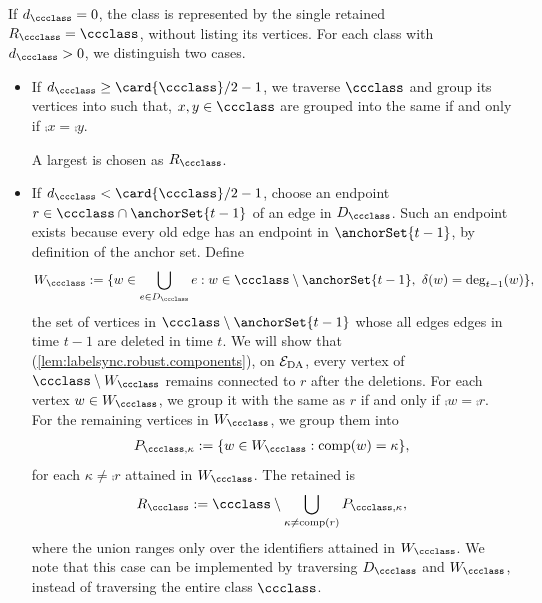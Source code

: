 If $ d_{\ccclass}=0 $, the class is represented by the single retained \piece{} $ R_{\ccclass}=\ccclass $, without listing its vertices.
For each class with $ d_{\ccclass}>0 $, we distinguish two cases.
\begin{itemize}
    \item If $ d_{\ccclass}\ge\card{\ccclass}/2-1 $, we traverse $ \ccclass $ and group its vertices into  such that, $ x,y \in \ccclass $ are grouped into the same \piece{} if and only if $ \comp{x}=\comp{y} $.

    A largest \piece{}  is chosen as $ \retainedPieces{\ccclass} $.
    \item If $ d_{\ccclass}<\card{\ccclass}/2-1 $, choose an endpoint $ r\in\ccclass\cap\anchorSet{t-1} $ of an edge in $ D_{\ccclass} $.
    Such an endpoint exists because every old edge has an endpoint in $ \anchorSet{t-1} $, by definition of the anchor set.
    Define
    \begin{align}
        W_{\ccclass}:=\{w\in\bigcup_{e\in D_{\ccclass}}e:
        w \in \ccclass\setminus\anchorSet{t-1},\ \delIncEdge{w}=\deg_{t-1}(w)\}, \nonumber
    \end{align}
    the set of vertices in $ \ccclass\setminus \anchorSet{t-1} $ whose all edges edges in time $ t-1 $ are deleted in time $ t $.
    We will show that (\cref{lem:labelsync.robust.components}), on $ \mathcal{E}_{\rm DA} $, every vertex of $ \ccclass\setminus W_{\ccclass} $ remains connected to $ r $ after the deletions.
    For each vertex $ w\in W_{\ccclass} $, we group it with the same \piece{} as $ r $ if and only if $ \comp{w}=\comp{r} $.
    For the remaining vertices in $ W_{\ccclass} $, we group them into 
    \begin{align}
        P_{\ccclass,\kappa}:=\{w\in W_{\ccclass}:\comp{w}=\kappa\}, \nonumber
    \end{align}
    for each $ \kappa\ne\comp{r} $ attained in $ W_{\ccclass} $.
    The retained \piece{} is
    \[
        R_{\ccclass}:=\ccclass\setminus\bigcup_{\kappa\ne\comp{r}}P_{\ccclass,\kappa},
    \]
    where the union ranges only over the identifiers attained in $ W_{\ccclass} $.
    We note that this case can be implemented by traversing $ D_{\ccclass} $ and $ W_{\ccclass} $, instead of traversing the entire class $ \ccclass $.
\end{itemize}

